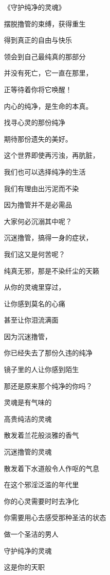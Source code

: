 \documentclass{ctexart}
\begin{document}
\begin{center}
    《守护纯净的灵魂》\it
    \begin{multicols}{2}
        摆脱撸管的束缚，获得重生

        得到真正的自由与快乐

        领会到自己最纯真的那部分

        并没有死亡，它一直在那里，

        正等待着你将它唤醒！

        内心的纯净，是生命的本真。

        找寻心灵的那份纯净

        期待那份遗失的美好。

        这个世界即使再污浊，再肮脏，

        我们也可以选择纯净的生活

        我们有理由出污泥而不染

        因为撸管并不是必需品

        大家何必沉溺其中呢？

        沉迷撸管，搞得一身的症状，

        我们这又是何苦呢？

        纯真无邪，那是不染纤尘的天籁

        从你的灵魂里穿过，

        让你感到莫名的心痛

        甚至让你泪流满面

        因为沉迷撸管，

        你已经失去了那份久违的纯净

        镜子里的人让你感到陌生

        那还是原来那个纯净的你吗？

        灵魂是有气味的

        高贵纯洁的灵魂

        散发着兰花般淡雅的香气

        沉迷撸管的灵魂

        散发着下水道般令人作呕的气息

        在这个邪淫泛滥的年代里

        你的心灵需要时时去净化

        你需要用心去感受那种圣洁的状态

        做一个圣洁的男人

        守护纯净的灵魂

        这是你的天职
    \end{multicols}
\end{center}
\end{document}
